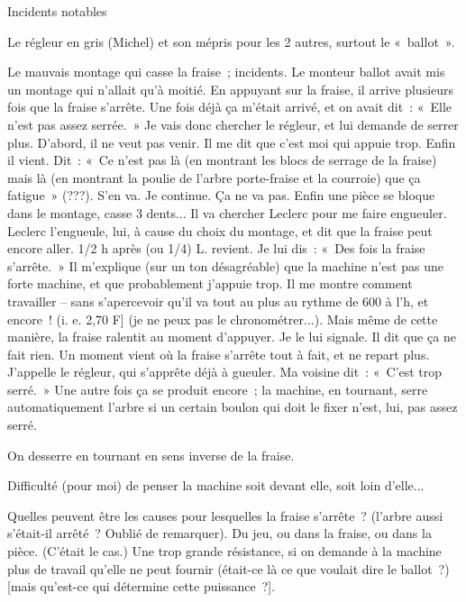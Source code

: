 \documentclass[french,twoside]{book} %
\begin{document}
\begin{center}
Incidents notables\end{center}
\noindent \par
Le régleur en gris (Michel) et son mépris pour les 2 autres, surtout le « ballot ».\par
\par
Le mauvais montage qui casse la fraise ; incidents. Le monteur ballot avait mis un montage qui n'allait qu'à moitié. En appuyant sur la fraise, il arrive plusieurs fois que la fraise s'arrête. Une fois déjà ça m'était arrivé, et on avait dit : « Elle n'est pas assez serrée. » Je vais donc chercher le régleur, et lui demande de serrer plus. D'abord, il ne veut pas venir. Il me dit que c'est moi qui appuie trop. Enfin il vient. Dit : « Ce n'est pas là (en montrant les blocs de serrage de la fraise) mais là (en montrant la poulie de l'arbre porte-fraise et la courroie) que ça fatigue » (???). S'en va. Je continue. Ça ne va pas. Enfin une pièce se bloque dans le montage, casse 3 dents... Il va chercher Leclerc pour me faire engueuler. Leclerc l'engueule, lui, à cause du choix du montage, et dit que la fraise peut encore aller. 1/2 h après (ou 1/4) L. revient. Je lui dis : « Des fois la fraise s'arrête. » Il m'explique (sur un ton désagréable) que la machine n'est pas une forte machine, et que probablement j'appuie trop. Il me montre comment travailler – sans s'apercevoir qu'il va tout au plus au rythme de 600 à l'h, et encore ! (i. e. 2,70 F] (je ne peux pas le chronométrer...). Mais même de cette manière, la fraise ralentit au moment d'appuyer. Je le lui signale. Il dit que ça ne fait rien. Un moment vient où la fraise s'arrête tout à fait, et ne repart plus. J'appelle le régleur, qui s'apprête déjà à gueuler. Ma voisine dit : « C'est trop serré. » Une autre fois ça se produit encore ; la machine, en tournant, serre automatiquement l'arbre si un certain boulon qui doit le fixer n'est, lui, pas assez serré.\par
On desserre en tournant en sens inverse de la fraise.\par
Difficulté (pour moi) de penser la machine soit devant elle, soit loin d'elle...\par
Quelles peuvent être les causes pour lesquelles la fraise s'arrête ? (l'arbre aussi s'était-il arrêté ? Oublié de remarquer). Du jeu, ou dans la fraise, ou dans la pièce. (C'était le cas.) Une trop grande résistance, si on demande à la machine plus de travail qu'elle ne peut fournir (était-ce là ce que voulait dire le ballot ?) [mais qu'est-ce qui détermine cette puissance ?].\par
\end{document}
